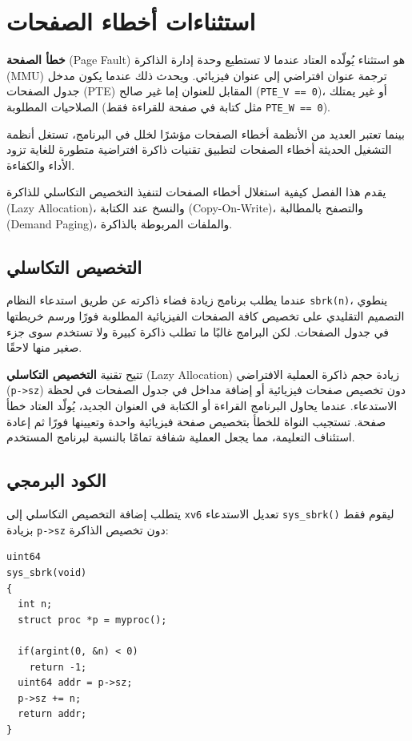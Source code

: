 \chapter{استثناءات أخطاء الصفحات}
\label{CH:PGFAULT}

\textbf{خطأ الصفحة} (Page Fault) هو استثناء يُولّده العتاد عندما لا تستطيع وحدة إدارة الذاكرة (MMU) ترجمة عنوان افتراضي إلى عنوان فيزيائي.
ويحدث ذلك عندما يكون مدخل جدول الصفحات (PTE) المقابل للعنوان إما غير صالح (\texttt{PTE\_V == 0})، أو غير يمتلك الصلاحيات المطلوبة (مثل كتابة في صفحة للقراءة فقط \texttt{PTE\_W == 0}).

بينما تعتبر العديد من الأنظمة أخطاء الصفحات مؤشرًا لخلل في البرنامج، تستغل أنظمة التشغيل الحديثة أخطاء الصفحات لتطبيق تقنيات ذاكرة افتراضية متطورة للغاية تزود الأداء والكفاءة.

يقدم هذا الفصل كيفية استغلال أخطاء الصفحات لتنفيذ التخصيص التكاسلي للذاكرة (Lazy Allocation)، والنسخ عند الكتابة (Copy-On-Write)، والتصفح بالمطالبة (Demand Paging)، والملفات المربوطة بالذاكرة.

\section{التخصيص التكاسلي}
\label{sec:lazy_allocation}

عندما يطلب برنامج زيادة فضاء ذاكرته عن طريق استدعاء النظام \texttt{sbrk(n)}، ينطوي التصميم التقليدي على تخصيص كافة الصفحات الفيزيائية المطلوبة فورًا ورسم خريطتها في جدول الصفحات.
لكن البرامج غالبًا ما تطلب ذاكرة كبيرة ولا تستخدم سوى جزء صغير منها لاحقًا.

تتيح تقنية \textbf{التخصيص التكاسلي} (Lazy Allocation) زيادة حجم ذاكرة العملية الافتراضي (\texttt{p->sz}) دون تخصيص صفحات فيزيائية أو إضافة مداخل في جدول الصفحات في لحظة الاستدعاء.
عندما يحاول البرنامج القراءة أو الكتابة في العنوان الجديد، يُولّد العتاد خطأ صفحة.
تستجيب النواة للخطأ بتخصيص صفحة فيزيائية واحدة وتعيينها فورًا ثم إعادة استئناف التعليمة، مما يجعل العملية شفافة تمامًا بالنسبة لبرنامج المستخدم.

\section{الكود البرمجي}
\label{sec:code_pgfault}

يتطلب إضافة التخصيص التكاسلي إلى \texttt{xv6} تعديل الاستدعاء \texttt{sys\_sbrk()} ليقوم فقط بزيادة \texttt{p->sz} دون تخصيص الذاكرة:
\begin{lstlisting}
uint64
sys_sbrk(void)
{
  int n;
  struct proc *p = myproc();

  if(argint(0, &n) < 0)
    return -1;
  uint64 addr = p->sz;
  p->sz += n;
  return addr;
}
\end{lstlisting}

